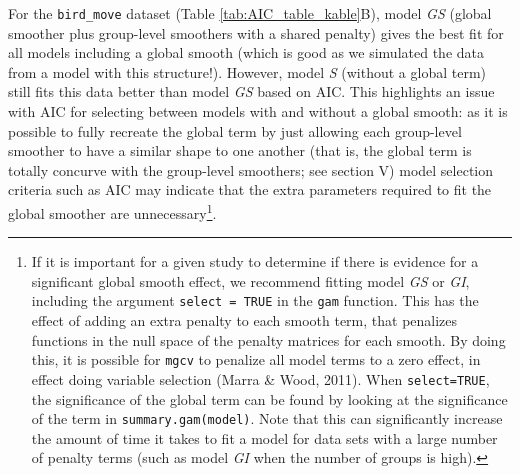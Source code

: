 \documentclass[12pt]{article}
\let\rmarkdownfootnote\footnote%
\def\footnote{\protect\rmarkdownfootnote}
\begin{document}
For the \texttt{bird\_move} dataset (Table \ref{tab:AIC_table_kable}B),
model \emph{GS} (global smoother plus group-level smoothers with a
shared penalty) gives the best fit for all models including a global
smooth (which is good as we simulated the data from a model with this
structure!). However, model \emph{S} (without a global term) still fits
this data better than model \emph{GS} based on AIC. This highlights an
issue with AIC for selecting between models with and without a global
smooth: as it is possible to fully recreate the global term by just
allowing each group-level smoother to have a similar shape to one
another (that is, the global term is totally concurve with the
group-level smoothers; see section V) model selection criteria such as
AIC may indicate that the extra parameters required to fit the global
smoother are unnecessary\footnote{If it is important for a given study
  to determine if there is evidence for a significant global smooth
  effect, we recommend fitting model \emph{GS} or \emph{GI}, including
  the argument \texttt{select\ =\ TRUE} in the \texttt{gam} function.
  This has the effect of adding an extra penalty to each smooth term,
  that penalizes functions in the null space of the penalty matrices for
  each smooth. By doing this, it is possible for \texttt{mgcv} to
  penalize all model terms to a zero effect, in effect doing variable
  selection (Marra \& Wood, 2011). When \texttt{select=TRUE}, the
  significance of the global term can be found by looking at the
  significance of the term in \texttt{summary.gam(model)}. Note that
  this can significantly increase the amount of time it takes to fit a
  model for data sets with a large number of penalty terms (such as
  model \emph{GI} when the number of groups is high).}.
\end{document}
